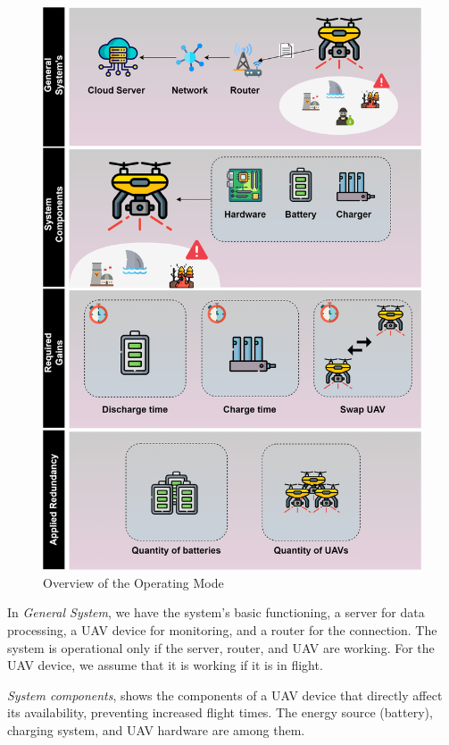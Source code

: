 \documentclass[conference]{IEEEtran}
\begin{document}
\begin{figure}[htbp]
\centerline{\includegraphics[scale=0.45]{img/operating_model.png}}
\caption{Overview of the Operating Mode}
\label{fig:operating_mode_overview}
\end{figure}

In \textit{General System}, we have the system's basic functioning, a server for data processing, a UAV device for monitoring, and a router for the connection. The system is operational only if the server, router, and UAV are working. For the UAV device, we assume that it is working if it is in flight.

\textit{System components}, shows the components of a UAV device that directly affect its availability, preventing increased flight times. The energy source (battery), charging system, and UAV hardware are among them.
\end{document}
